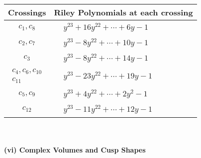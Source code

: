 \documentclass[1p]{elsarticle_modified}
\theoremstyle{definition}
\begin{document}
\begin{tabular}{m{50pt}|m{274pt}}
Crossings & \hspace{64pt}Riley Polynomials at each crossing \\
\hline $$\begin{aligned}c_{1},c_{8}\end{aligned}$$&$\begin{aligned}
&y^{23}+16 y^{22}+\cdots+6 y-1
\end{aligned}$\\
\hline $$\begin{aligned}c_{2},c_{7}\end{aligned}$$&$\begin{aligned}
&y^{23}-8 y^{22}+\cdots+10 y-1
\end{aligned}$\\
\hline $$\begin{aligned}c_{3}\end{aligned}$$&$\begin{aligned}
&y^{23}-8 y^{22}+\cdots+14 y-1
\end{aligned}$\\
\hline $$\begin{aligned}c_{4},c_{6},c_{10}\\c_{11}\end{aligned}$$&$\begin{aligned}
&y^{23}-23 y^{22}+\cdots+19 y-1
\end{aligned}$\\
\hline $$\begin{aligned}c_{5},c_{9}\end{aligned}$$&$\begin{aligned}
&y^{23}+4 y^{22}+\cdots+2 y^2-1
\end{aligned}$\\
\hline $$\begin{aligned}c_{12}\end{aligned}$$&$\begin{aligned}
&y^{23}-11 y^{22}+\cdots+12 y-1
\end{aligned}$\\
\hline
\end{tabular}\\~\\
\newpage\flushleft \textbf{(vi) Complex Volumes and Cusp Shapes}
\end{document}
